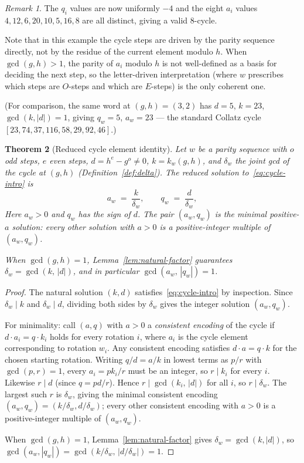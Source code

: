 \documentclass[12pt]{article}
\newtheorem{theorem}{Theorem}[section]
\theoremstyle{definition}
\theoremstyle{remark}
\newtheorem{remark}[theorem]{Remark}
\newcommand{\kpoly}{k}
\begin{document}
\begin{remark}
\noindent The $q_i$ values are now uniformly $-4$ and the eight $a_i$ values
$4, 12, 6, 20, 10, 5, 16, 8$ are all distinct, giving a valid $8$-cycle.

\smallskip
Note that in this example the cycle steps are driven by the parity sequence
directly, not by the residue of the current element modulo $h$.  When
$\gcd(g,h) > 1$, the parity of $a_i$ modulo $h$ is not well-defined as a
basis for deciding the next step, so the letter-driven interpretation
(where $w$ prescribes which steps are $O$-steps and which are $E$-steps)
is the only coherent one.

\smallskip
(For comparison, the same word at $(g,h)=(3,2)$ has $d=5$, $k=23$,
$\gcd(k,|d|)=1$, giving $q_w=5$, $a_w=23$ — the standard Collatz cycle
$[23, 74, 37, 116, 58, 29, 92, 46]$.)
\end{remark}

\begin{theorem}[Reduced cycle element identity]
\label{thm:cycle}
Let $w$ be a parity sequence with $o$ odd steps, $e$ even steps,
$d = h^e - g^o \neq 0$, $k = \kpoly_w(g,h)$, and $\delta_w$ the joint gcd of
the cycle at $(g,h)$ (Definition~\ref{def:delta}).
The \emph{reduced solution} to~\eqref{eq:cycle-intro} is
\[
  a_w \;=\; \frac{k}{\delta_w}, \qquad q_w \;=\; \frac{d}{\delta_w},
\]
Here $a_w > 0$ and $q_w$ has the sign of $d$.  The pair $(a_w, q_w)$ is
the minimal positive-$a$ solution: every other solution with $a > 0$ is a
positive-integer multiple of $(a_w, q_w)$.

When $\gcd(g,h) = 1$, Lemma~\ref{lem:natural-factor} guarantees
$\delta_w = \gcd(k,\,|d|)$, and in particular $\gcd(a_w,\,|q_w|) = 1$.
\end{theorem}

\begin{proof}
The natural solution $(k,d)$ satisfies~\eqref{eq:cycle-intro} by
inspection.  Since $\delta_w \mid k$ and $\delta_w \mid d$, dividing both
sides by $\delta_w$ gives the integer solution $(a_w, q_w)$.

For minimality: call $(a, q)$ with $a > 0$ a \emph{consistent encoding}
of the cycle if $d \cdot a_i = q \cdot k_i$ holds for every rotation $i$,
where $a_i$ is the cycle element corresponding to rotation $w_i$.  Any
consistent encoding satisfies $d \cdot a = q \cdot k$ for the chosen
starting rotation.  Writing $q/d = a/k$ in lowest terms as $p/r$ with
$\gcd(p,r)=1$, every $a_i = p k_i / r$ must be an integer, so $r \mid
k_i$ for every $i$.  Likewise $r \mid d$ (since $q = pd/r$).  Hence
$r \mid \gcd(k_i,\,|d|)$ for all $i$, so $r \mid \delta_w$.  The
largest such $r$ is $\delta_w$, giving the minimal consistent encoding
$(a_w, q_w) = (k/\delta_w, d/\delta_w)$; every other consistent encoding
with $a > 0$ is a positive-integer multiple of $(a_w, q_w)$.

When $\gcd(g,h)=1$, Lemma~\ref{lem:natural-factor} gives $\delta_w =
\gcd(k,|d|)$, so $\gcd(a_w,|q_w|) = \gcd(k/\delta_w,\,|d/\delta_w|) = 1$.
\end{proof}
\end{document}
